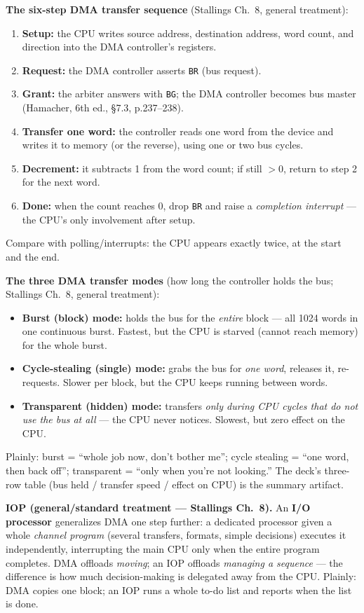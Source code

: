 \documentclass[11pt]{article}
\begin{document}
\textbf{The six-step DMA transfer sequence} (Stallings Ch.~8, general treatment):
\begin{enumerate}
  \item \textbf{Setup:} the CPU writes source address, destination address, word count, and direction into the DMA controller's registers.
  \item \textbf{Request:} the DMA controller asserts \texttt{BR} (bus request).
  \item \textbf{Grant:} the arbiter answers with \texttt{BG}; the DMA controller becomes bus master (Hamacher, 6th ed., \S7.3, p.237--238).
  \item \textbf{Transfer one word:} the controller reads one word from the device and writes it to memory (or the reverse), using one or two bus cycles.
  \item \textbf{Decrement:} it subtracts 1 from the word count; if still $>0$, return to step 2 for the next word.
  \item \textbf{Done:} when the count reaches 0, drop \texttt{BR} and raise a \emph{completion interrupt} --- the CPU's only involvement after setup.
\end{enumerate}
Compare with polling/interrupts: the CPU appears exactly twice, at the start and the end.

\textbf{The three DMA transfer modes} (how long the controller holds the bus; Stallings Ch.~8, general treatment):
\begin{itemize}
  \item \textbf{Burst (block) mode:} holds the bus for the \emph{entire} block --- all 1024 words in one continuous burst. Fastest, but the CPU is starved (cannot reach memory) for the whole burst.
  \item \textbf{Cycle-stealing (single) mode:} grabs the bus for \emph{one word}, releases it, re-requests. Slower per block, but the CPU keeps running between words.
  \item \textbf{Transparent (hidden) mode:} transfers \emph{only during CPU cycles that do not use the bus at all} --- the CPU never notices. Slowest, but zero effect on the CPU.
\end{itemize}
Plainly: burst = ``whole job now, don't bother me''; cycle stealing = ``one word, then back off''; transparent = ``only when you're not looking.'' The deck's three-row table (bus held / transfer speed / effect on CPU) is the summary artifact.

\textbf{IOP (general/standard treatment --- Stallings Ch.~8).} An \textbf{I/O processor} generalizes DMA one step further: a dedicated processor given a whole \emph{channel program} (several transfers, formats, simple decisions) executes it independently, interrupting the main CPU only when the entire program completes. DMA offloads \emph{moving}; an IOP offloads \emph{managing a sequence} --- the difference is how much decision-making is delegated away from the CPU. Plainly: DMA copies one block; an IOP runs a whole to-do list and reports when the list is done.
\end{document}
